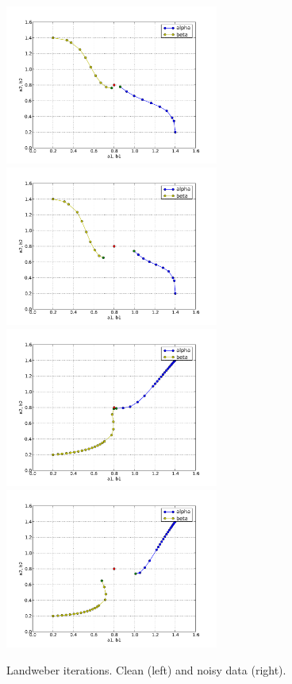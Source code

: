 \begin{figure}
\begin{center}
    \includegraphics[width=7cm]{chapters/schroll/pdf/4D-1scan3.pdf}
    \includegraphics[width=7cm]{chapters/schroll/pdf/4D-1scan3-5.pdf}
    \includegraphics[width=7cm]{chapters/schroll/pdf/4D-1scan4.pdf}
    \includegraphics[width=7cm]{chapters/schroll/pdf/4D-1scan4-5.pdf}
    \vspace{-0.7cm}
    \caption{Landweber iterations. Clean (left) and noisy data (right).}
    \label{fig5}
  \end{center}
\end{figure}

